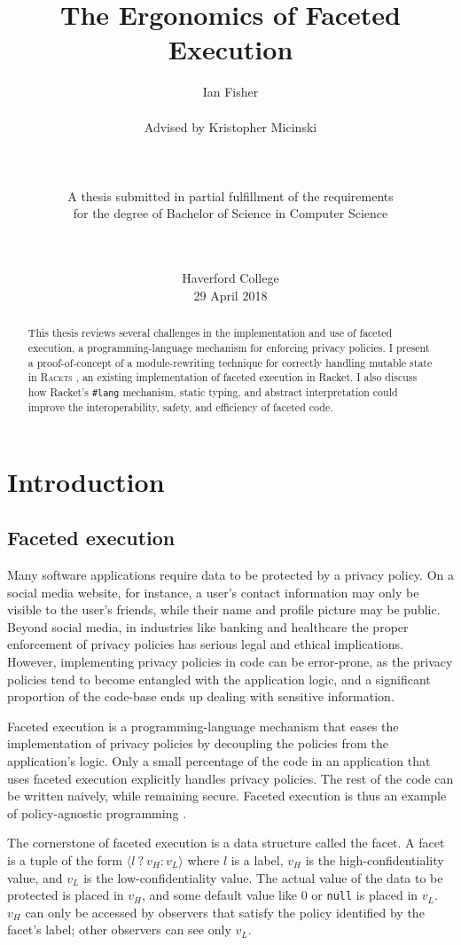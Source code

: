 \documentclass{article}
\title{The Ergonomics of Faceted Execution}
\author{Ian Fisher \\ \\ Advised by Kristopher Micinski \\ \\ \\ \\ A thesis submitted in partial fulfillment of the requirements \\ for the degree of Bachelor of Science in Computer Science \\ \\ \\}
\date{Haverford College \\ 29 April 2018}
\begin{document}
\maketitle

\begin{abstract}
	This thesis reviews several challenges in the implementation and use of faceted execution, a programming-language mechanism for enforcing privacy policies. I present a proof-of-concept of a module-rewriting technique for correctly handling mutable state in \textsc{Racets} \cite{racets}, an existing implementation of faceted execution in Racket. I also discuss how Racket's \texttt{\#lang} mechanism, static typing, and abstract interpretation could improve the interoperability, safety, and efficiency of faceted code.
\end{abstract}

\newpage
\tableofcontents
\newpage



\section{Introduction\label{sec:intro}}
\subsection{Faceted execution\label{sec:facets}}
Many software applications require data to be protected by a privacy policy. On a social media website, for instance, a user's contact information may only be visible to the user's friends, while their name and profile picture may be public. Beyond social media, in industries like banking and healthcare the proper enforcement of privacy policies has serious legal and ethical implications. However, implementing privacy policies in code can be error-prone, as the privacy policies tend to become entangled with the application logic, and a significant proportion of the code-base ends up dealing with sensitive information.

Faceted execution is a programming-language mechanism that eases the implementation of privacy policies by decoupling the policies from the application's logic. Only a small percentage of the code in an application that uses faceted execution explicitly handles privacy policies. The rest of the code can be written naively, while remaining secure. Faceted execution is thus an example of policy-agnostic programming \cite{faceted}.

The cornerstone of faceted execution is a data structure called the facet. A facet is a tuple of the form $\langle l\ ?\ v_H : v_L \rangle$ where $l$ is a label, $v_H$ is the high-confidentiality value, and $v_L$ is the low-confidentiality value. The actual value of the data to be protected is placed in $v_H$, and some default value like $0$ or \texttt{null} is placed in $v_L$. $v_H$ can only be accessed by observers that satisfy the policy identified by the facet's label; other observers can see only $v_L$.
\end{document}

